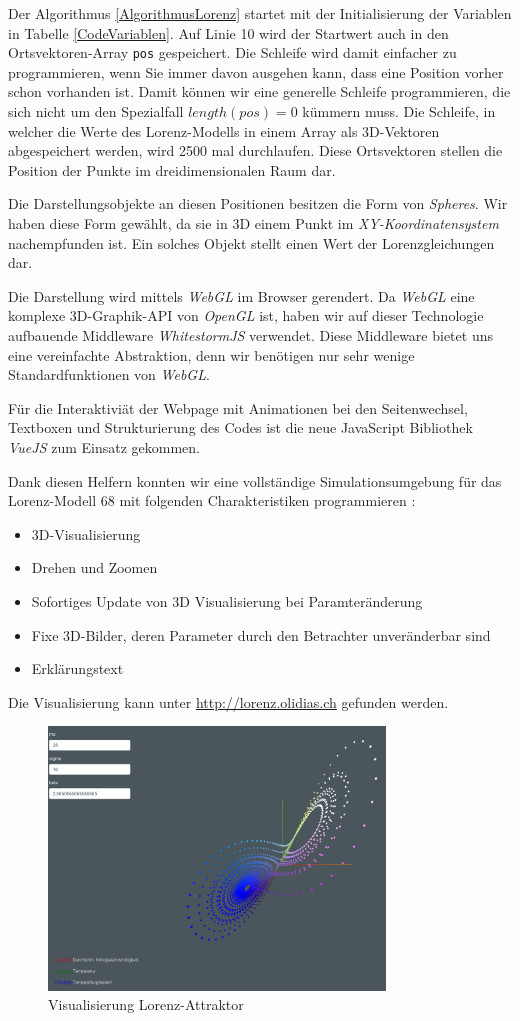 Der Algorithmus \ref{AlgorithmusLorenz} startet mit der Initialisierung der Variablen in Tabelle \ref{CodeVariablen}. Auf Linie 10 wird der Startwert auch in den Ortsvektoren-Array \texttt{pos} gespeichert. Die Schleife wird damit einfacher zu programmieren, wenn Sie immer davon ausgehen kann, dass eine Position vorher schon vorhanden ist. Damit können wir eine generelle Schleife programmieren, die sich nicht um den Spezialfall $ length(pos) = 0 $ kümmern muss.
Die Schleife, in welcher die Werte des Lorenz-Modells in einem Array als 3D-Vektoren abgespeichert werden, wird 2500 mal durchlaufen. Diese Ortsvektoren stellen die Position der Punkte im dreidimensionalen Raum dar.

Die Darstellungsobjekte an diesen Positionen besitzen die Form von {\em Spheres}. Wir haben diese Form gewählt, da sie in 3D einem Punkt im {\em XY-Koordinatensystem} nachempfunden ist. Ein solches Objekt stellt einen Wert der Lorenzgleichungen dar.

Die Darstellung wird mittels {\em WebGL} \cite{WebGL} im Browser gerendert. Da {\em WebGL} eine komplexe 3D-Graphik-API von {\em OpenGL} ist, haben wir auf dieser Technologie aufbauende Middleware {\em WhitestormJS} \cite{whitestormJS} verwendet. Diese Middleware bietet uns eine vereinfachte Abstraktion, denn wir benötigen nur sehr wenige Standardfunktionen von {\em WebGL}.
%
%
%

Für die Interaktiviät der Webpage mit Animationen bei den Seitenwechsel, Textboxen und Strukturierung des Codes ist die neue JavaScript Bibliothek {\em VueJS} \cite{VueJS} zum Einsatz gekommen.
%

Dank diesen Helfern konnten wir
eine vollständige Simulationsumgebung für das Lorenz-Modell 68 mit folgenden Charakteristiken programmieren \cite{visualisierung}:
\begin{itemize}
	\item 3D-Visualisierung
	\item Drehen und Zoomen
	\item Sofortiges Update von 3D Visualisierung bei Paramteränderung
	\item Fixe 3D-Bilder, deren Parameter durch den Betrachter unveränderbar sind
	\item Erklärungstext
\end{itemize}
Die Visualisierung kann unter \url{http://lorenz.olidias.ch} gefunden werden.

\begin{figure}
	\centering	\includegraphics[height=7cm]{lorenz/assets/implementation/Visualisierung}
	\caption{Visualisierung Lorenz-Attraktor}
	\label{fig:visualisierung}
\end{figure}
